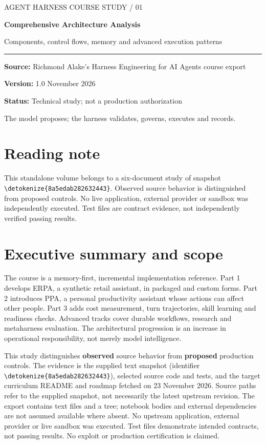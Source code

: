 \documentclass[11pt,letterpaper]{article}
\newcommand{\src}[1]{\expandafter\nolinkurl\expandafter{\detokenize{#1}}}
\begin{document}
\begin{titlepage}
\vspace*{1.25in}
{\color{teal}\large AGENT HARNESS COURSE STUDY / 01\par}\vspace{.3in}
{\color{navy}\Huge\bfseries Comprehensive Architecture Analysis\par}\vspace{.18in}
{\Large Components, control flows, memory and advanced execution patterns\par}\vspace{.5in}
\rule{\linewidth}{1pt}\par
\textbf{Source:} Richmond Alake's Harness Engineering for AI Agents course export\par
\textbf{Version:} 1.0  November 2026\par
\textbf{Status:} Technical study; not a production authorization\par
\vfill
The model proposes; the harness validates, governs, executes and records.
\end{titlepage}
\tableofcontents\clearpage
\section*{Reading note}
This standalone volume belongs to a six-document study of snapshot \src{8a5edab282632443}. Observed source behavior is distinguished from proposed controls. No live application, external provider or sandbox was independently executed. Test files are contract evidence, not independently verified passing results.

\section{Executive summary and scope}
The course is a memory-first, incremental implementation reference. Part 1 develops ERPA, a synthetic retail assistant, in packaged and custom forms. Part 2 introduces PPA, a personal productivity assistant whose actions can affect other people. Part 3 adds cost measurement, turn trajectories, skill learning and readiness checks. Advanced tracks cover durable workflows, research and metaharness evaluation. The architectural progression is an increase in operational responsibility, not merely model intelligence.

This study distinguishes \textbf{observed} source behavior from \textbf{proposed} production controls. The evidence is the supplied text snapshot (identifier \src{8a5edab282632443}), selected source code and tests, and the target curriculum README and roadmap fetched on 23 November 2026. Source paths refer to the supplied snapshot, not necessarily the latest upstream revision. The export contains text files and a tree; notebook bodies and external dependencies are not assumed available where absent. No upstream application, external provider or live sandbox was executed. Test files demonstrate intended contracts, not passing results. No exploit or production certification is claimed.
\end{document}
